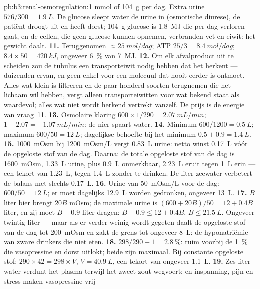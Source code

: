 \begin{solution}{pb:b3:renal-osmoregulation:1}
mmol of \qty{104}{g} per dag. Extra urine $576/300 = \qty{1.9}{L}$. De
glucose sleept water de urine in (osmotische diurese), de patiënt
droogt uit en heeft dorst; \qty{104}{g} glucose is \qty{1.8}{MJ} die per
dag verloren gaat, en de cellen, die geen glucose kunnen opnemen,
verbranden vet en eiwit: het gewicht daalt.
\textbf{11.} Teruggenomen $\approx \qty{25}{mol/dag}$; ATP $25/3 =
\qty{8.4}{mol/dag}$; $8.4\times 50 = \qty{420}{kJ}$, ongeveer \qty{6}{\%}
van \qty{7}{MJ}.
\textbf{12.} Om elk afvalproduct uit te scheiden zou de tubulus een
transporteiwit nodig hebben dat het herkent --- duizenden ervan, en
geen enkel voor een molecuul dat nooit eerder is ontmoet. Alles wat
klein is filtreren en de paar honderd soorten terugnemen die het
lichaam wil hebben, vergt alleen transporteiwitten voor wat bekend
staat als waardevol; alles wat niet wordt herkend vertrekt vanzelf. De
prijs is de energie van vraag~11.
\textbf{13.} Osmolaire klaring $600\times 1/290 = \qty{2.07}{mL/min}$;
 $1 - 2.07 = -\qty{1.07}{mL/min}$: de nier spaart
water.
\textbf{14.} Minimum $600/1200 = \qty{0.5}{L}$; maximum $600/50 =
\qty{12}{L}$; dagelijkse behoefte bij het minimum $0.5 + 0.9 = \qty{1.4}{L}$.
\textbf{15.} \qty{1000}{mOsm} bij \qty{1200}{mOsm/L} vergt
\qty{0.83}{L} urine: netto winst \qty{0.17}{L} vóór de opgeloste stof
van de dag. Daarna: de totale opgeloste stof van de dag is
\qty{1600}{mOsm}, \qty{1.33}{L} urine, plus \qty{0.9}{L} onmerkbaar,
\qty{2.23}{L} eruit tegen \qty{1}{L} erin --- een tekort van
\qty{1.23}{L}, tegen \qty{1.4}{L} zonder te drinken. De liter zeewater
verbetert de balans met slechts \qty{0.17}{L}.
\textbf{16.} Urine van \qty{50}{mOsm/L} voor de dag: $600/50 =
\qty{12}{L}$; er moet dagelijks \qty{12.9}{L} worden gedronken, ongeveer \qty{13}{L}.
\textbf{17.} $B$ liter bier brengt $20B$ mOsm; de maximale urine is
$(600 + 20B)/50 = 12 + 0.4B$ liter, en zij moet $B - 0.9$ liter dragen:
$B - 0.9 \le 12 + 0.4B$, $B \le \qty{21.5}{L}$. Ongeveer twintig liter
--- maar als er verder weinig wordt gegeten daalt de opgeloste stof van
de dag tot \qty{200}{mOsm} en zakt de grens tot ongeveer \qty{8}{L}: de
hyponatriëmie van zware drinkers die niet eten.
\textbf{18.} $298/290 - 1 = \qty{2.8}{\%}$: ruim voorbij de \qty{1}{\%}
die vasopressine en dorst uitlokt; beide zijn maximaal. Bij constante
opgeloste stof: $290\times 42 = 298\times V$, $V = \qty{40.9}{L}$, een
tekort van ongeveer \qty{1.1}{L}.
\textbf{19.} Zes liter water verdunt het plasma terwijl het zweet zout
wegvoert; en inspanning, pijn en stress maken vasopressine vrij

\end{solution}
